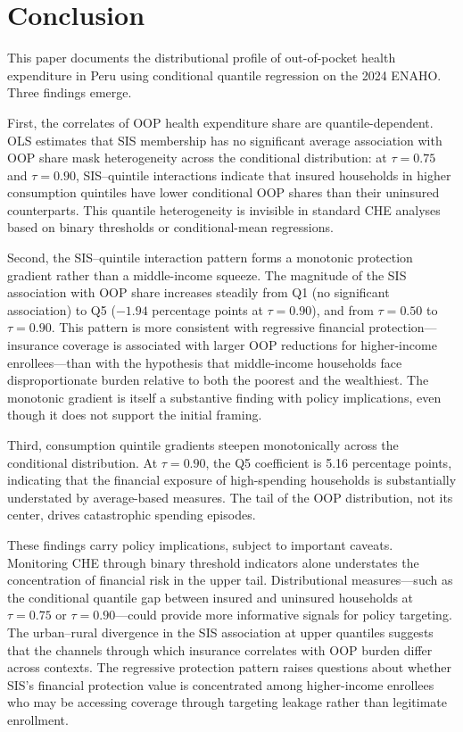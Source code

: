 \section{Conclusion}\label{sec:conclusion}

This paper documents the distributional profile of out-of-pocket health expenditure in Peru using conditional quantile regression on the 2024 ENAHO. Three findings emerge.

First, the correlates of OOP health expenditure share are quantile-dependent. OLS estimates that SIS membership has no significant average association with OOP share mask heterogeneity across the conditional distribution: at $\tau = 0.75$ and $\tau = 0.90$, SIS--quintile interactions indicate that insured households in higher consumption quintiles have lower conditional OOP shares than their uninsured counterparts. This quantile heterogeneity is invisible in standard CHE analyses based on binary thresholds or conditional-mean regressions.

Second, the SIS--quintile interaction pattern forms a monotonic protection gradient rather than a middle-income squeeze. The magnitude of the SIS association with OOP share increases steadily from Q1 (no significant association) to Q5 ($-1.94$ percentage points at $\tau = 0.90$), and from $\tau = 0.50$ to $\tau = 0.90$. This pattern is more consistent with regressive financial protection---insurance coverage is associated with larger OOP reductions for higher-income enrollees---than with the hypothesis that middle-income households face disproportionate burden relative to both the poorest and the wealthiest. The monotonic gradient is itself a substantive finding with policy implications, even though it does not support the initial framing.

Third, consumption quintile gradients steepen monotonically across the conditional distribution. At $\tau = 0.90$, the Q5 coefficient is 5.16 percentage points, indicating that the financial exposure of high-spending households is substantially understated by average-based measures. The tail of the OOP distribution, not its center, drives catastrophic spending episodes.

These findings carry policy implications, subject to important caveats. Monitoring CHE through binary threshold indicators alone understates the concentration of financial risk in the upper tail. Distributional measures---such as the conditional quantile gap between insured and uninsured households at $\tau = 0.75$ or $\tau = 0.90$---could provide more informative signals for policy targeting. The urban--rural divergence in the SIS association at upper quantiles suggests that the channels through which insurance correlates with OOP burden differ across contexts. The regressive protection pattern raises questions about whether SIS's financial protection value is concentrated among higher-income enrollees who may be accessing coverage through targeting leakage rather than legitimate enrollment.

